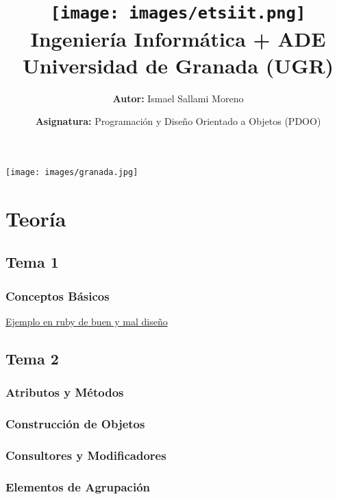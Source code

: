 \documentclass[a4paper,12pt]{article}
\title{
    \vspace{-2cm}
    \texttt{[image: images/etsiit.png]} \\ %
    \LARGE Ingeniería Informática + ADE\\
    \large Universidad de Granada (UGR)\\[1cm]
}
\author{\textbf{Autor:} Ismael Sallami Moreno}
\date{\textbf{Asignatura:} Programación y Diseño Orientado a Objetos (PDOO)}
\begin{document}
\maketitle
\thispagestyle{empty}

\begin{center}
    \texttt{[image: images/granada.jpg]} \\ %
    \vfill
\end{center}

\newpage

\tableofcontents
\newpage

\section{Teoría}
\subsection{Tema 1}
\subsubsection{Conceptos Básicos}

\href{https://github.com/ElblogdeIsmael/ElblogdeIsmael.github.io/tree/main/Asignaturas/Tercer%20A%C3%B1o/PDOO/Teoria/Diapositivas/}{Ejemplo en ruby de buen y mal diseño}

\subsection{Tema 2}
\subsubsection{Atributos y Métodos}

\subsubsection{Construcción de Objetos}

\subsubsection{Consultores y Modificadores}

\subsubsection{Elementos de Agrupación}

\end{document}

